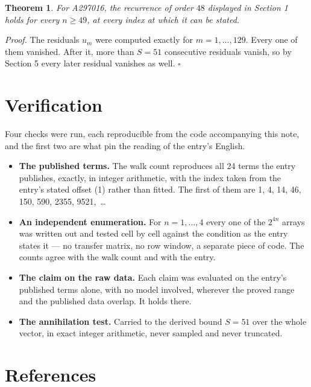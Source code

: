\documentclass[11pt]{article}
\newtheorem{theorem}{Theorem}
\theoremstyle{definition}
\begin{document}
\begin{theorem} For A297016, the recurrence of order $48$ displayed in Section 1 holds for every $n \ge 49$, at every index at which it can be stated.\end{theorem}

{\itshape Proof.} The residuals $u_m$ were computed exactly for $m = 1,\dots,129$. Every one of them vanished. After it, more than $S = 51$ consecutive residuals vanish, so by Section 5 every later residual vanishes as well. $\square$

\section{Verification}

Four checks were run, each reproducible from the code accompanying this note, and the first two are what pin the reading of the entry's English.

\begin{itemize}

\item {\bfseries The published terms.} The walk count reproduces all 24 terms the entry publishes, exactly, in integer arithmetic, with the index taken from the entry's stated offset (1) rather than fitted. The first of them are 1, 4, 14, 46, 150, 590, 2355, 9521,~\dots

\item {\bfseries An independent enumeration.} For $n = 1,\dots,4$ every one of the $2^{4n}$ arrays was written out and tested cell by cell against the condition as the entry states it --- no transfer matrix, no row window, a separate piece of code. The counts agree with the walk count and with the entry.

\item {\bfseries The claim on the raw data.} Each claim was evaluated on the entry's published terms alone, with no model involved, wherever the proved range and the published data overlap. It holds there.

\item {\bfseries The annihilation test.} Carried to the derived bound $S = 51$ over the whole vector, in exact integer arithmetic, never sampled and never truncated.

\end{itemize}

\section{References}
\end{document}
